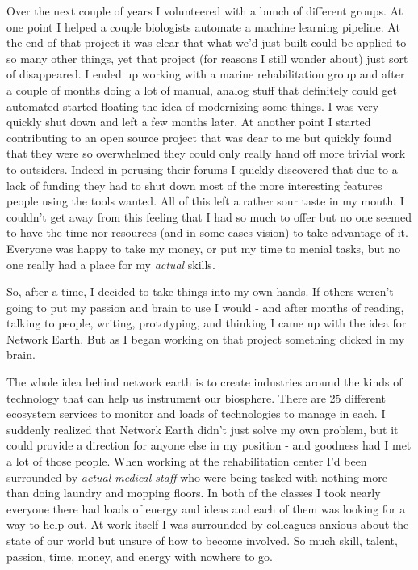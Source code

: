 \documentclass[11pt,a5paper]{book}
\begin{document}
Over the next couple of years I volunteered with a bunch of different groups. At one point I helped a couple biologists automate a machine learning pipeline. At the end of that project it was clear that what we'd just built could be applied to so many other things, yet that project (for reasons I still wonder about) just sort of disappeared. I ended up working with a marine rehabilitation group and after a couple of months doing a lot of manual, analog stuff that definitely could get automated started floating the idea of modernizing some things. I was very quickly shut down and left a few months later. At another point I started contributing to an open source project that was dear to me but quickly found that they were so overwhelmed they could only really hand off  more trivial work to outsiders. Indeed in perusing their forums I quickly discovered that due to a lack of funding they had to shut down most of the more interesting features people using the tools wanted. All of this left a rather sour taste in my mouth. I couldn't get away from this feeling that I had so much to offer but no one seemed to have the time nor resources (and in some cases vision) to take advantage of it. Everyone was happy to take my money, or put my time to menial tasks, but no one really had a place for my \textit{actual} skills.
\newline

So, after a time, I decided to take things into my own hands. If others weren't going to put my passion and brain to use I would - and after months of reading, talking to people, writing, prototyping, and thinking I came up with the idea for Network Earth. But as I began working on that project something clicked in my brain. 
\newline

The whole idea behind network earth is to create industries around the kinds of technology that can help us instrument our biosphere. There are 25 different ecosystem services to monitor and loads of technologies to manage in each. I suddenly realized that Network Earth didn't just solve my own problem, but it could provide a direction for anyone else in my position - and goodness had I met a lot of those people. When working at the rehabilitation center I'd been surrounded by \textit{actual medical staff} who were being tasked with nothing more than doing laundry and mopping floors. In both of the classes I took nearly everyone there had loads of energy and ideas and each of them was looking for a way to help out. At work itself I was surrounded by colleagues anxious about the state of our world but unsure of how to become involved. So much skill, talent, passion, time, money, and energy with nowhere to go. 
\newline
\end{document}
